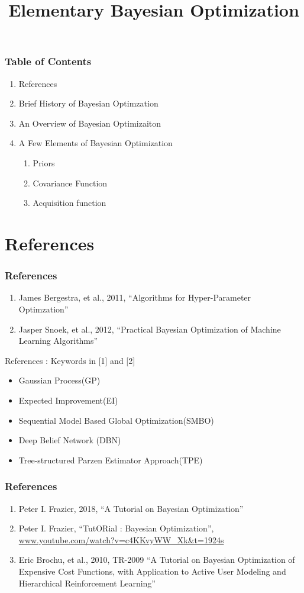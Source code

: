 \documentclass{beamer}
\title{Elementary Bayesian Optimization}
\begin{document}
%
\frame{\titlepage}

%
\begin{frame}
\frametitle{Table of Contents}
\begin{enumerate}[1.]
\item
References
\item
Brief History of Bayesian Optimzation
\item
An Overview of Bayesian Optimizaiton
\item
A Few Elements of Bayesian Optimization
\begin{enumerate}
\item
Priors
\item
Covariance Function
\item
Acquisition function
\end{enumerate}
\end{enumerate}
\end{frame}

\section{References}

%
\begin{frame}
\frametitle{References}
\begin{enumerate}
\item[1.]
James Bergestra, et al., 2011, ``Algorithms for Hyper-Parameter Optimzation''
\item[2.]
Jasper Snoek, et al., 2012, ``Practical Bayesian Optimization of Machine Learning Algorithms''
\end{enumerate}
\end{frame}

%
\begin{frame}{References : Keywords in [1] and [2]}
\begin{itemize}
\item
Gaussian Process(GP)
\item
Expected Improvement(EI)
\item
Sequential Model Based Global Optimization(SMBO)
\item
Deep Belief Network (DBN)
\item
Tree-structured Parzen Estimator Approach(TPE)
\end{itemize}
\end{frame}

%
\begin{frame}
\frametitle{References}
\begin{enumerate}
\item[3.]
Peter I. Frazier, 2018, ``A Tutorial on Bayesian Optimization''
\item[4.]
Peter I. Frazier, ``TutORial : Bayesian Optimization'', \url{www.youtube.com/watch?v=c4KKvyWW_Xk&t=1924s}
\item[5.]
Eric Brochu, et al., 2010, TR-2009 ``A Tutorial on Bayesian Optimization of Expensive Cost Functions, with Application to Active User Modeling and Hierarchical Reinforcement Learning''
\end{enumerate}
\end{frame}
\end{document}
